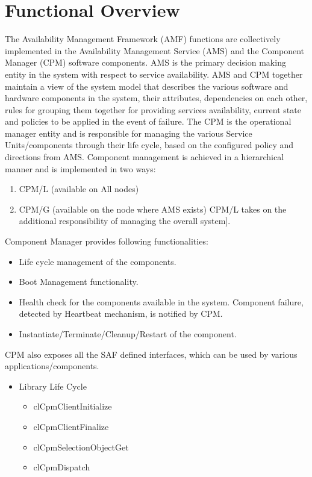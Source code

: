 
\hypertarget{group__group14}{
\chapter{Functional Overview}
\label{group__group14}
}

The Availability Management Framework (AMF) functions are collectively implemented in the Availability Management Service (AMS) and the
Component Manager (CPM) software components. AMS is the primary decision making entity in the system with respect to service availability. AMS and CPM 
together maintain a view of the system model that describes the various software and hardware components in the system, their attributes, dependencies 
on each other, rules for grouping them together for providing services availability, current state and policies to be applied in the event of failure. 
The CPM is the operational manager entity and is responsible for managing the various Service Units/components through their life cycle, based on 
the configured policy and directions from AMS.
Component management is achieved in a hierarchical manner and is implemented in two ways:\begin{enumerate}
\item CPM/L (available on All nodes\mbox)\item CPM/G (available on the node where AMS exists) CPM/L takes on the additional 
responsibility of managing the overall system\mbox{]}.\end{enumerate}


Component Manager provides following functionalities:\begin{itemize}
\item Life cycle management of the components.\item Boot Management functionality.\item Health check for the components available in the system. 
Component failure, detected by Heartbeat mechanism, is notified by CPM.\item Instantiate/Terminate/Cleanup/Restart of the component.\end{itemize}


CPM also exposes all the SAF defined interfaces, which can be used by various applications/components.\begin{itemize}
\item Library Life Cycle\begin{itemize}
\item cl\-Cpm\-Client\-Initialize\item cl\-Cpm\-Client\-Finalize\item cl\-Cpm\-Selection\-Object\-Get\item cl\-Cpm\-Dispatch\end{itemize}
\end{itemize}


